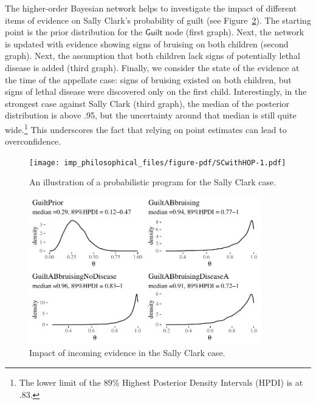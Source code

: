 \documentclass[
  letterpaper,
  DIV=11,
  numbers=noendperiod]{scrartcl}
\newcommand{\s}[1]{\mbox{$\mathsf{#1}$}}
\begin{document}
The higher-order Bayesian network helps to investigate the impact of
different items of evidence on Sally Clark's probability of guilt (see
Figure~\ref{fig-scwithhop2}). The starting point is the prior
distribution for the \s{Guilt} node (first graph). Next, the network is
updated with evidence showing signs of bruising on both children (second
graph). Next, the assumption that both children lack signs of
potentially lethal disease is added (third graph). Finally, we consider
the state of the evidence at the time of the appellate case: signs of
bruising existed on both children, but signs of lethal disease were
discovered only on the first child. Interestingly, in the strongest case
against Sally Clark (third graph), the median of the posterior
distribution is above .95, but the uncertainty around that median is
still quite wide.\footnote{The lower limit of the 89\% Highest Posterior
  Density Intervals (HPDI) is at .83.} This underscores the fact that
relying on point estimates can lead to overconfidence.

\begin{figure}[htbp] 
    \centering
    \texttt{[image: imp\_philosophical\_files/figure-pdf/SCwithHOP-1.pdf]}
    \caption{An illustration of a probabilistic program for the Sally Clark case.}
    \label{fig-scwithhop}
\end{figure}

\begin{figure}[H]

{\centering \includegraphics[width=0.9\textwidth,height=\textheight]{imp_philosophical_files/figure-pdf/fig-scwithhop2-1.pdf}

}

\caption{\label{fig-scwithhop2}Impact of incoming evidence in the Sally
Clark case.}

\end{figure}
\end{document}
